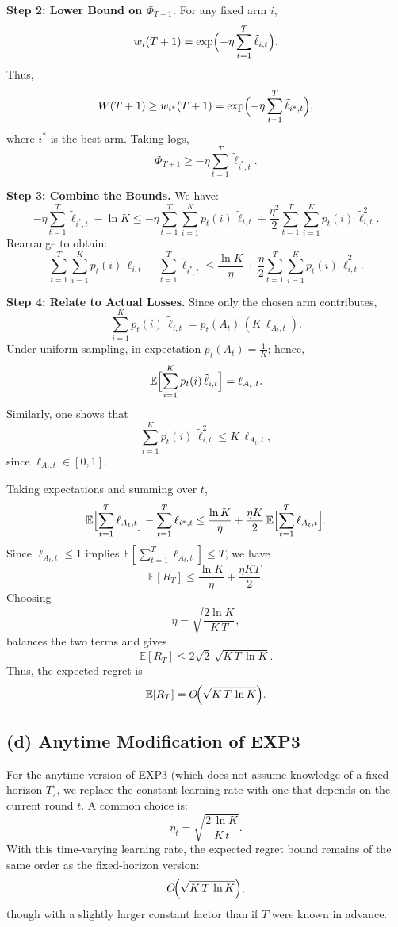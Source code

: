 \medskip
\noindent
\textbf{Step 2: Lower Bound on \(\Phi_{T+1}\).}  
For any fixed arm \(i\),
\[
   w_i(T+1)=\exp\Bigl(-\eta\sum_{t=1}^T\tilde{\ell}_{i,t}\Bigr).
\]
Thus,
\[
   W(T+1)\ge w_{i^*}(T+1)=\exp\Bigl(-\eta\sum_{t=1}^T\tilde{\ell}_{i^*,t}\Bigr),
\]
where \(i^*\) is the best arm. Taking logs,
\[
   \Phi_{T+1}\ge -\eta\sum_{t=1}^T\tilde{\ell}_{i^*,t}.
\]

\medskip
\noindent
\textbf{Step 3: Combine the Bounds.}  
We have:
\[
  -\eta\sum_{t=1}^T\tilde{\ell}_{i^*,t} -\ln K \le -\eta\sum_{t=1}^T\sum_{i=1}^K p_t(i)\,\tilde{\ell}_{i,t} + \frac{\eta^2}{2}\sum_{t=1}^T\sum_{i=1}^K p_t(i)\,\tilde{\ell}_{i,t}^2.
\]
Rearrange to obtain:
\[
  \sum_{t=1}^T\sum_{i=1}^K p_t(i)\,\tilde{\ell}_{i,t} - \sum_{t=1}^T\tilde{\ell}_{i^*,t} \le \frac{\ln K}{\eta} + \frac{\eta}{2}\sum_{t=1}^T\sum_{i=1}^K p_t(i)\,\tilde{\ell}_{i,t}^2.
\]

\medskip
\noindent
\textbf{Step 4: Relate to Actual Losses.}  
Since only the chosen arm contributes,
\[
   \sum_{i=1}^K p_t(i)\,\tilde{\ell}_{i,t} = p_t(A_t)\,(K\,\ell_{A_t,t}).
\]
Under uniform sampling, in expectation \(p_t(A_t)=\frac{1}{K}\); hence,
\[
   \mathbb{E}\Bigl[\sum_{i=1}^K p_t(i)\,\tilde{\ell}_{i,t}\Bigr] = \ell_{A_t,t}.
\]
Similarly, one shows that
\[
   \sum_{i=1}^K p_t(i)\,\tilde{\ell}_{i,t}^2 \le K\,\ell_{A_t,t},
\]
since \(\ell_{A_t,t}\in [0,1]\).

Taking expectations and summing over \(t\),
\[
   \mathbb{E}\Bigl[\sum_{t=1}^T \ell_{A_t,t}\Bigr] - \sum_{t=1}^T \ell_{i^*,t} \le \frac{\ln K}{\eta} + \frac{\eta K}{2}\,\mathbb{E}\Bigl[\sum_{t=1}^T \ell_{A_t,t}\Bigr].
\]
Since \(\ell_{A_t,t}\le 1\) implies \(\mathbb{E}[\sum_{t=1}^T \ell_{A_t,t}]\le T\), we have
\[
   \mathbb{E}[R_T] \le \frac{\ln K}{\eta} + \frac{\eta K T}{2}.
\]
Choosing
\[
   \eta = \sqrt{\frac{2\ln K}{K\,T}},
\]
balances the two terms and gives
\[
   \mathbb{E}[R_T] \le 2\sqrt{2}\,\sqrt{K\,T\,\ln K}.
\]
Thus, the expected regret is
\[
   \mathbb{E}[R_T] = O\!\Bigl(\sqrt{K\,T\,\ln K}\Bigr).
\]

\bigskip
\subsection*{(d) Anytime Modification of EXP3}

For the anytime version of EXP3 (which does not assume knowledge of a fixed horizon \(T\)), we replace the constant learning rate with one that depends on the current round \(t\). A common choice is:
\[
    \eta_t = \sqrt{\frac{2\,\ln K}{K\,t}}.
\]
With this time-varying learning rate, the expected regret bound remains of the same order as the fixed-horizon version:
\[
    O\!\Bigl(\sqrt{K\,T\,\ln K}\Bigr),
\]
though with a slightly larger constant factor than if \(T\) were known in advance.